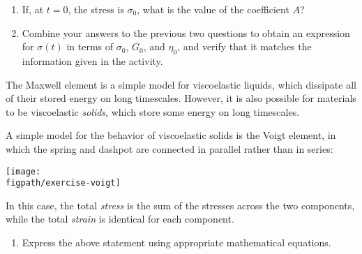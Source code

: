 \begin{activity}
\begin{exercises}
\begin{enumerate}
				\item If, at $t=0$, the stress is $\sigma_0$, what is the value of the coefficient $A$?
				
					\begin{solution}\end{solution}
				
				\item Combine your answers to the previous two questions to obtain an expression for $\sigma(t)$ in terms of $\sigma_0$, $G_0$, and $\eta_0$, and verify that it matches the information given in the activity.
				
					\begin{solution}\end{solution}
			\end{enumerate}
		
		\exercise \label{\labelbase:exc:voigt} The Maxwell element is a simple model for viscoelastic liquids, which dissipate all of their stored energy on long timescales.  However, it is also possible for materials to be viscoelastic \emph{solids}, which store some energy on long timescales.
		
			A simple model for the behavior of viscoelastic solids is the Voigt element, in which the spring and dashpot are connected in parallel rather than in series:
		
			\vspace{3pt}
			\centerline{\texttt{[image: \\figpath/exercise-voigt]}}
			
			In this case, the total \emph{stress} is the sum of the stresses across the two components, while the total \emph{strain} is identical for each component.
			
			\begin{enumerate}
				\item Express the above statement using appropriate mathematical equations. 
				
					\begin{solution}
\end{solution}
\end{enumerate}
\end{exercises}
\end{activity}

